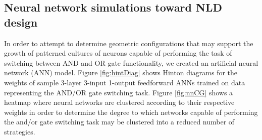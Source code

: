 \subsection{Neural network simulations toward NLD design}
In order to attempt to determine geometric configurations that may support the growth of patterned cultures of neurons capable of performing the task of switching between AND and OR gate functionality, we created an artificial neural network (ANN) model. Figure \ref{fig:hintDiag} shows Hinton diagrams for the weights of sample 3-layer 3-input 1-output feedforward ANNs trained on data representing the AND/OR gate switching task. Figure \ref{fig:nnCG} shows a heatmap where neural networks are clustered according to their respective weights in order to determine the degree to which networks capable of performing the and/or gate switching task may be clustered into a reduced number of strategies.

